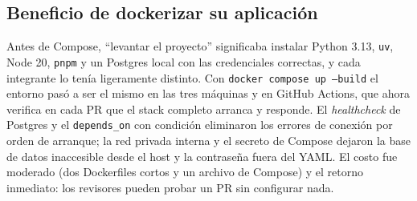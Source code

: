 \subsection{Beneficio de dockerizar su aplicación}
Antes de Compose, ``levantar el proyecto'' significaba instalar Python 3.13, \texttt{uv}, Node 20, \texttt{pnpm} y un Postgres local con las credenciales correctas, y cada integrante lo tenía ligeramente distinto. Con \texttt{docker compose up --build} el entorno pasó a ser el mismo en las tres máquinas y en GitHub Actions, que ahora verifica en cada PR que el stack completo arranca y responde. El \emph{healthcheck} de Postgres y el \texttt{depends\_on} con condición eliminaron los errores de conexión por orden de arranque; la red privada interna y el secreto de Compose dejaron la base de datos inaccesible desde el host y la contraseña fuera del YAML. El costo fue moderado (dos Dockerfiles cortos y un archivo de Compose) y el retorno inmediato: los revisores pueden probar un PR sin configurar nada.
